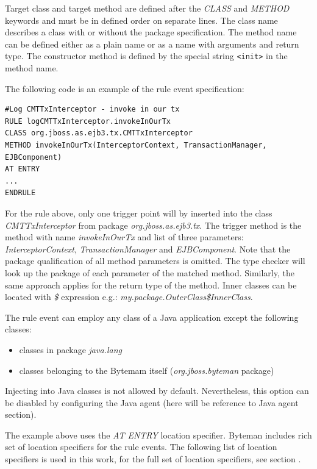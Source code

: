 \documentclass[12pt,oneside]{fithesis2}
\begin{document}
Target class and target method are defined after the \textit{CLASS} and \textit{METHOD} keywords and must be in defined order on separate lines. The class name describes a class with or without the package specification. The method name can be defined either as a plain name or as a name with arguments and return type. The constructor method is defined by the special string \verb|<init>| in the method name.

The following code is an example of the rule event specification:

\begin{lstlisting}[caption = Rule event specification, label = rule_event_code]
#Log CMTTxInterceptor - invoke in our tx
RULE logCMTTxInterceptor.invokeInOurTx
CLASS org.jboss.as.ejb3.tx.CMTTxInterceptor
METHOD invokeInOurTx(InterceptorContext, TransactionManager, EJBComponent)
AT ENTRY
...
ENDRULE
\end{lstlisting}

For the rule above, only one trigger point will by inserted into the class \textit{CMTTxInterceptor} from package \textit{org.jboss.as.ejb3.tx}. The trigger method is the method with name \textit{invokeInOurTx} and list of three parameters: \textit{InterceptorContext}, \textit{TransactionManager} and \textit{EJBComponent}. Note that the package qualification of all method parameters is omitted. The type checker will look up the package of each parameter of the matched method. Similarly, the same approach applies for the return type of the method. Inner classes can be located with \textit{\$} expression e.g.: \textit{my.package.OuterClass\$InnerClass}.

The rule event can employ any class of a Java application except the following classes:

\begin{itemize}
   \item classes in package \textit{java.lang}
   \item classes belonging to the Bytemam itself (\textit{org.jboss.byteman} package)
\end{itemize}

Injecting into Java classes is not allowed by default. Nevertheless, this option can be disabled by configuring the Java agent (here will be reference to Java agent section).

The example above uses the \textit{AT ENTRY} location specifier. Byteman includes rich set of location specifiers for the rule events. The following list of location specifiers is used in this work, for the full set of location specifiers, see section \cite[Location Specifiers]{byteman_doc}.
\end{document}
